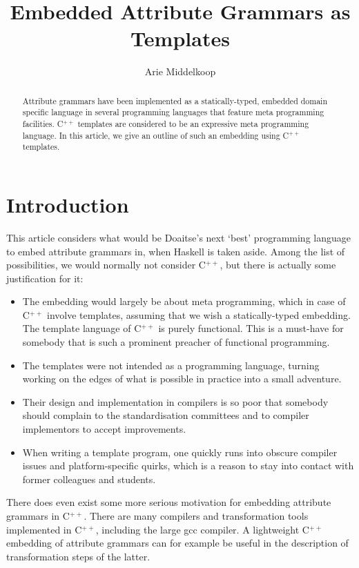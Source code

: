 \documentclass{llncs}
\title{Embedded Attribute Grammars as \Cpp{} Templates}
\author{Arie Middelkoop}
\institute{\email{amiddelk@gmail.com}}
\newcommand*{\Cpp}{C\ensuremath{^{++}}}
\begin{document}
  \maketitle

  \begin{abstract}
  Attribute grammars have been implemented as a statically-typed,
  embedded domain specific language
  in several programming languages that feature meta programming facilities.
  \Cpp{} templates are considered to be an expressive meta programming language.
  In this article, we give an outline of such an embedding using \Cpp{} templates.
  \end{abstract}
 
\section{Introduction}
\label{sec:introduction}

  This article considers what would be Doaitse's next `best' programming language 
  to embed attribute grammars in, when Haskell is taken aside.
  Among the list of possibilities, we would normally not consider \Cpp, but
  there is actually some justification for it:
  \begin{itemize}
  \item The embedding would largely be about meta programming, which in case of
    \Cpp{} involve templates, assuming that we wish a statically-typed embedding.
    The template language of \Cpp{} is purely functional. This is a must-have for
    somebody that is such a prominent preacher of functional programming.
  \item The templates were not intended as a programming language, turning
    working on the edges of what is possible in practice into a small
    adventure.
  \item
    Their design and implementation in compilers is so poor that somebody
    should complain to the standardisation committees and to compiler
    implementors to accept improvements.
  \item
    When writing a template program, one quickly runs into
    obscure compiler issues and platform-specific quirks, which is a
    reason to stay into contact with former colleagues and students.
  \end{itemize}
  There does even exist some more serious motivation for embedding
  attribute grammars in \Cpp. There are many compilers
  and transformation tools implemented in \Cpp, including the
  large gcc compiler. A lightweight \Cpp{}
  embedding of attribute grammars can for example be useful in the
  description of transformation steps of the latter.
\end{document}

